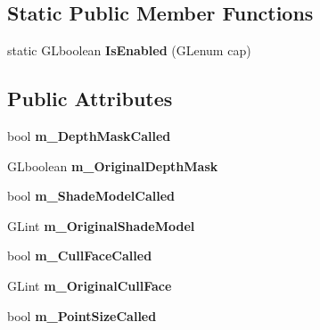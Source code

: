 \subsection*{Static Public Member Functions}
\begin{DoxyCompactItemize}
\item 
static G\+Lboolean {\bfseries Is\+Enabled} (G\+Lenum cap)\hypertarget{classpangolin_1_1_gl_state_a97db77ba073cac7084bdd457a1572a32}{}\label{classpangolin_1_1_gl_state_a97db77ba073cac7084bdd457a1572a32}

\end{DoxyCompactItemize}
\subsection*{Public Attributes}
\begin{DoxyCompactItemize}
\item 
bool {\bfseries m\+\_\+\+Depth\+Mask\+Called}\hypertarget{classpangolin_1_1_gl_state_afedb7765bdeea3dfa74993caea9d0fc6}{}\label{classpangolin_1_1_gl_state_afedb7765bdeea3dfa74993caea9d0fc6}

\item 
G\+Lboolean {\bfseries m\+\_\+\+Original\+Depth\+Mask}\hypertarget{classpangolin_1_1_gl_state_ad273b32587d3cbf3fbaeaffdaf058d3a}{}\label{classpangolin_1_1_gl_state_ad273b32587d3cbf3fbaeaffdaf058d3a}

\item 
bool {\bfseries m\+\_\+\+Shade\+Model\+Called}\hypertarget{classpangolin_1_1_gl_state_ae3d9e06c8accf4dd47f446b853660fb2}{}\label{classpangolin_1_1_gl_state_ae3d9e06c8accf4dd47f446b853660fb2}

\item 
G\+Lint {\bfseries m\+\_\+\+Original\+Shade\+Model}\hypertarget{classpangolin_1_1_gl_state_ad81319f85b2e427d444756ec5602629b}{}\label{classpangolin_1_1_gl_state_ad81319f85b2e427d444756ec5602629b}

\item 
bool {\bfseries m\+\_\+\+Cull\+Face\+Called}\hypertarget{classpangolin_1_1_gl_state_a9d1a2ff2b0a74c2c2bc0718f8f6a5822}{}\label{classpangolin_1_1_gl_state_a9d1a2ff2b0a74c2c2bc0718f8f6a5822}

\item 
G\+Lint {\bfseries m\+\_\+\+Original\+Cull\+Face}\hypertarget{classpangolin_1_1_gl_state_af6e06e270f71d5e6a19b1e08575ec793}{}\label{classpangolin_1_1_gl_state_af6e06e270f71d5e6a19b1e08575ec793}

\item 
bool {\bfseries m\+\_\+\+Point\+Size\+Called}\hypertarget{classpangolin_1_1_gl_state_a2c27e8f5699e8e54a54f7c3e73a956f1}{}\label{classpangolin_1_1_gl_state_a2c27e8f5699e8e54a54f7c3e73a956f1}


\end{DoxyCompactItemize}
